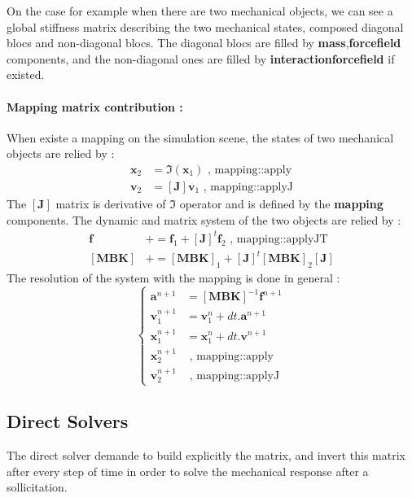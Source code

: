 \documentclass[a4paper,10pt]{article}
\begin{document}
On the case for example when there are two mechanical objects, we can see a global stiffness matrix describing the two mechanical states, composed diagonal blocs and non-diagonal blocs. The diagonal blocs are filled by \textbf{\color{orange}mass},\textbf{\color{orange}forcefield} components, and the non-diagonal ones are filled by \textbf{\color{orange}interactionforcefield} if existed.
\paragraph{Mapping matrix contribution : } When existe a mapping on the simulation scene, the states of two mechanical objects are relied by : 
\[
\begin{array}{rl}
\textbf{x}_{2} & = \Im\left(\textbf{x}_{1}\right)           \text{      ,	mapping::apply}             \\
\textbf{v}_{2} & = \left[\textbf{J}\right] \textbf{v}_{1}   \text{      ,	mapping::applyJ}  
\end{array}
\]
The $\left[\textbf{J}\right]$ matrix is derivative of $\Im$ operator and is defined by the \textbf{\color{orange}mapping} components. The dynamic and matrix system of the two objects are relied by :   
\[
\begin{array}{rl}
\textbf{f}                  & += \textbf{f}_{1}  +   \left[\textbf{J}\right]^{t} \textbf{f}_{2}         \text{      ,	mapping::applyJT}             \\
\left[ \textbf{MBK} \right] & += \left[ \textbf{MBK} \right]_{1}  + \left[\textbf{J}\right]^{t}  \left[ \textbf{MBK} \right]_{2} \left[\textbf{J}\right]
\end{array}
\]
The resolution of the system with the mapping is done in general :
\[
\left\{ 
\begin{array}{rl}
\textbf{a}^{n+1}        & = \left[ \textbf{MBK} \right]^{-1}  \textbf{f}^{n+1}    \\
\textbf{v}^{n+1}_{1}    & = \textbf{v}^{n}_{1}     + dt.\textbf{a}^{n+1}         \\
\textbf{x}^{n+1}_{1}    & = \textbf{x}^{n}_{1}     + dt.\textbf{v}^{n+1}         \\
\textbf{x}^{n+1}_{2}    &  \text{ ,	mapping::apply }     \\
\textbf{v}^{n+1}_{2}    &  \text{ ,	mapping::applyJ }          
\end{array}
\right.
\]



\subsection{Direct Solvers }
The direct solver demande to build explicitly the matrix, and invert this matrix after every step of time in order to solve the mechanical response after a sollicitation.
\end{document}
